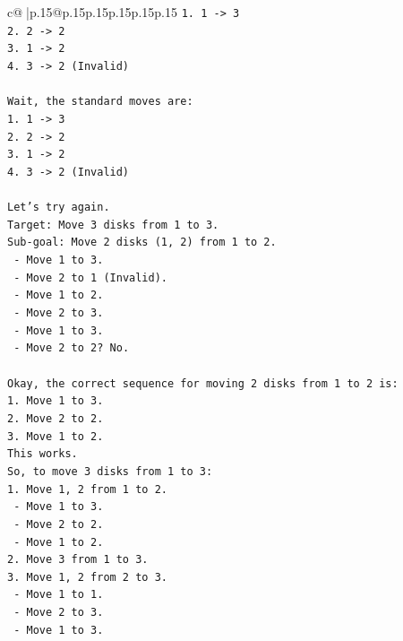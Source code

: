 \documentclass{article}
\begin{document}
{\begin{supertabular}{c@{$\;$}|p{.15\linewidth}@{}p{.15\linewidth}p{.15\linewidth}p{.15\linewidth}p{.15\linewidth}p{.15\linewidth}}
{{{\texttt{1. 1 {-}> 3} \\
\texttt{2. 2 {-}> 2} \\
\texttt{3. 1 {-}> 2} \\
\texttt{4. 3 {-}> 2 (Invalid)} \\
\\ 
\texttt{Wait, the standard moves are:} \\
\texttt{1. 1 {-}> 3} \\
\texttt{2. 2 {-}> 2} \\
\texttt{3. 1 {-}> 2} \\
\texttt{4. 3 {-}> 2 (Invalid)} \\
\\ 
\texttt{Let's try again.} \\
\texttt{Target: Move 3 disks from 1 to 3.} \\
\texttt{Sub{-}goal: Move 2 disks (1, 2) from 1 to 2.} \\
\texttt{  {-} Move 1 to 3.} \\
\texttt{  {-} Move 2 to 1 (Invalid).} \\
\texttt{  {-} Move 1 to 2.} \\
\texttt{  {-} Move 2 to 3.} \\
\texttt{  {-} Move 1 to 3.} \\
\texttt{  {-} Move 2 to 2? No.} \\
\\ 
\texttt{Okay, the correct sequence for moving 2 disks from 1 to 2 is:} \\
\texttt{1. Move 1 to 3.} \\
\texttt{2. Move 2 to 2.} \\
\texttt{3. Move 1 to 2.} \\
\texttt{This works.} \\
\texttt{So, to move 3 disks from 1 to 3:} \\
\texttt{1. Move 1, 2 from 1 to 2.} \\
\texttt{   {-} Move 1 to 3.} \\
\texttt{   {-} Move 2 to 2.} \\
\texttt{   {-} Move 1 to 2.} \\
\texttt{2. Move 3 from 1 to 3.} \\
\texttt{3. Move 1, 2 from 2 to 3.} \\
\texttt{   {-} Move 1 to 1.} \\
\texttt{   {-} Move 2 to 3.} \\
\texttt{   {-} Move 1 to 3.} \\
\\ 
}}}
\end{supertabular}}
\end{document}
